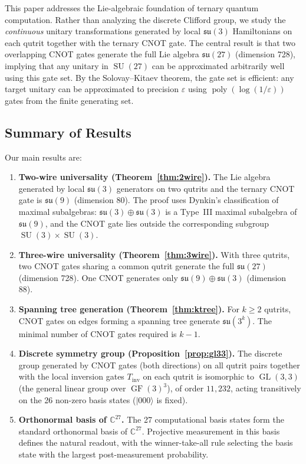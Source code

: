 \documentclass[12pt,a4paper]{article}
\newcommand{\GL}{\operatorname{GL}}
\newcommand{\SU}{\operatorname{SU}}
\newcommand{\GF}{\operatorname{GF}}
\begin{document}
This paper addresses the Lie-algebraic foundation of ternary quantum
computation. Rather than analyzing the discrete Clifford group, we
study the \emph{continuous} unitary transformations generated by local
$\mathfrak{su}(3)$ Hamiltonians on each qutrit together with the ternary
CNOT gate. The central result is that two overlapping CNOT gates generate
the full Lie algebra $\mathfrak{su}(27)$ (dimension 728), implying that
any unitary in $\SU(27)$ can be approximated arbitrarily well using
this gate set. By the Solovay--Kitaev theorem, the gate set is
efficient: any target unitary can be approximated to precision
$\varepsilon$ using $\operatorname{poly}(\log(1/\varepsilon))$ gates
from the finite generating set.

\subsection{Summary of Results}

Our main results are:

\begin{enumerate}
\item \textbf{Two-wire universality (Theorem~\ref{thm:2wire}).} The Lie
algebra generated by local $\mathfrak{su}(3)$ generators on two qutrits
and the ternary CNOT gate is $\mathfrak{su}(9)$ (dimension 80). The proof
uses Dynkin's classification of maximal subalgebras: $\mathfrak{su}(3)
\oplus \mathfrak{su}(3)$ is a Type~III maximal subalgebra of $\mathfrak{su}(9)$,
and the CNOT gate lies outside the corresponding subgroup
$\SU(3)\times \SU(3)$.

\item \textbf{Three-wire universality (Theorem~\ref{thm:3wire}).} With
three qutrits, two CNOT gates sharing a common qutrit generate the full
$\mathfrak{su}(27)$ (dimension 728). One CNOT generates only
$\mathfrak{su}(9)\oplus\mathfrak{su}(3)$ (dimension 88).

\item \textbf{Spanning tree generation (Theorem~\ref{thm:ktree}).} For
$k\ge 2$ qutrits, CNOT gates on edges forming a spanning tree generate
$\mathfrak{su}(3^k)$. The minimal number of CNOT gates required is $k-1$.

\item \textbf{Discrete symmetry group (Proposition~\ref{prop:gl33}).}
The discrete group generated by CNOT gates (both directions) on all qutrit
pairs together with the local inversion gates $T_{\mathrm{inv}}$ on each
qutrit is isomorphic to $\GL(3,3)$ (the general linear group over
$\GF(3)^3$), of order $11{,}232$, acting transitively on the 26 non-zero
basis states ($|000\rangle$ is fixed).

\item \textbf{Orthonormal basis of $\mathbb{C}^{27}$.} The 27 computational
basis states form the standard orthonormal basis of $\mathbb{C}^{27}$.
Projective measurement in this basis defines the natural readout, with
the winner-take-all rule selecting the basis state with the largest
post-measurement probability.
\end{enumerate}
\end{document}

